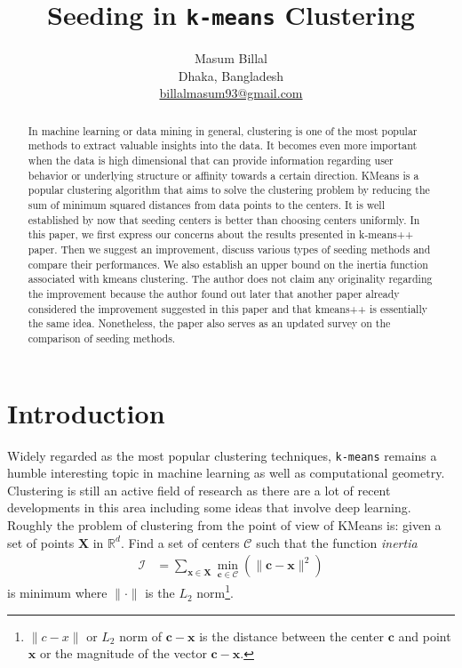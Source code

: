 \documentclass[12pt]{article}
\title{Seeding in \texttt{k-means} Clustering}
\author{Masum Billal\\Dhaka, Bangladesh\\\url{billalmasum93@gmail.com}}
\newcommand{\x}{\mathbf{x}}
\newcommand{\X}{\mathbf{X}}
\renewcommand{\c}{\mathbf{c}}
\newcommand{\C}{\mathcal{C}}
\begin{document}
	\maketitle
		\begin{abstract}%
			In machine learning or data mining in general, clustering is one of the most popular methods to extract valuable insights into the data. It becomes even more important when the data is high dimensional that can provide information regarding user behavior or underlying structure or affinity towards a certain direction. KMeans is a popular clustering algorithm that aims to solve the clustering problem by reducing the sum of minimum squared distances from data points to the centers. It is well established by now that seeding centers is better than choosing centers uniformly. In this paper, we first express our concerns about the results presented in k-means++ paper. Then we suggest an improvement, discuss various types of seeding methods and compare their performances. We also establish an upper bound on the inertia function associated with kmeans clustering. The author does not claim any originality regarding the improvement because the author found out later that another paper already considered the improvement suggested in this paper and that {kmeans++} is essentially the same idea. Nonetheless, the paper also serves as an updated survey on the comparison of seeding methods.
		\end{abstract}

	\section{Introduction}
	Widely regarded as the most popular clustering techniques, \texttt{k-means} remains a humble interesting topic in machine learning as well as computational geometry. Clustering is still an active field of research as there are a lot of recent developments in this area including some ideas that involve deep learning. Roughly the problem of clustering from the point of view of KMeans is: given a set of points $\X$ in $\mathbb{R}^d$. Find a set of centers $\mathcal{C}$ such that the function \textit{inertia}
		\begin{align*}
			\mathcal{I} & = \sum_{\x\in\X}\min_{\c\in\C}(\|\c-\x\|^2)
		\end{align*}
	is minimum where $\|\cdot\|$ is the $L_2$ norm\footnote{$\|c-x\|$ or $L_2$ norm of $\c-\x$ is the distance between the center $\c$ and point $\x$ or the magnitude of the vector $\c-\x$.}.
\end{document}
